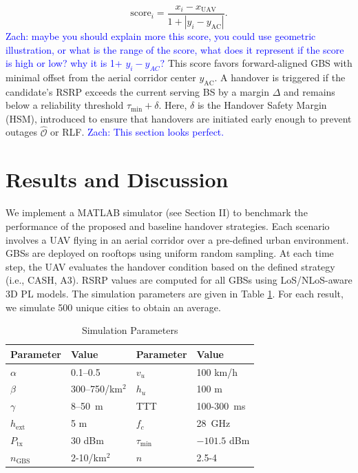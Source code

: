\documentclass[conference]{IEEEtran}
\newcommand*\zc[1]{\textcolor{blue}{Zach: #1}}
\begin{document}
\begin{equation}
\label{cashscore}
\text{score}_i = \frac{x_i - x_{\text{UAV}}}{1 + |y_i - y_{\text{AC}}|}.
\end{equation}
\zc{maybe you should explain more this score, you could use geometric illustration, or what is the range of the score, what does it represent if the score is high or low? why it is 1+ $y_i - y_{AC}$?}
This score favors forward-aligned GBS with minimal offset from the aerial corridor center $y_{\text{AC}}$. A handover is triggered if the candidate’s RSRP exceeds the current serving BS by a margin $\Delta$ and remains below a reliability threshold $\tau_{\min} + \delta$. Here, $\delta$ is the Handover Safety Margin (HSM), introduced to ensure that handovers are initiated early enough to prevent outages $\hat{\mathcal{O}}$ or RLF. \zc{This section looks perfect.}





\section{Results and Discussion}
We implement a MATLAB simulator (see Section II) to benchmark the performance of the proposed and baseline handover strategies. Each scenario involves a UAV flying in an aerial corridor over a pre-defined urban environment. GBSs are deployed on rooftops using uniform random sampling. At each time step, the UAV evaluates the handover condition based on the defined strategy (i.e., CASH, A3). RSRP values are computed for all GBSs using LoS/NLoS-aware 3D PL models. The simulation parameters are given in Table \ref{simparams}. For each result, we simulate 500 unique cities to obtain an average.


\begin{table}[t]
\caption{Simulation Parameters}
\centering
\begin{tabular}{|p{1.5cm}|p{1.5cm}|p{2cm}|p{2cm}|}
\hline
\textbf{Parameter} & \textbf{Value} & \textbf{Parameter} & \textbf{Value} \\
\hline
$\alpha$ & 0.1–0.5 & $v_u$ & 100 km/h \\ \hline
$\beta$ & 300–750/km$^2$ & $h_u$ & 100 m \\ \hline
$\gamma$ & 8–50~m & TTT & 100-300~ms \\ \hline
$h_{\text{ext}}$ & 5 m & $f_c$ & 28~GHz \\ \hline
$P_{\mathrm{tx}}$ & 30 dBm & $\tau_{\min}$ & $-101.5$ dBm \\ \hline
$n_{\text{GBS}}$ & 2-10/km$^2$ & $n$ & 2.5-4 \\ \hline
\end{tabular}
\label{simparams}
\vspace{-.5cm}
\end{table}
\end{document}

